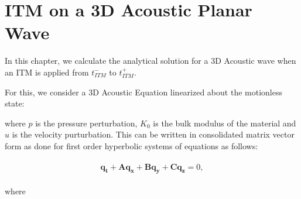 
\section{\ac{ITM} on a 3D Acoustic Planar Wave}\label{section:3DITMAcoustic}
In this chapter, we calculate the analytical solution for a 3D Acoustic wave when an \ac{ITM} is applied from $t_{ITM}^-$ to $t_{ITM}^+$.

For this, we consider a 3D Acoustic Equation linearized about the motionless state:

where $p$ is the pressure perturbation, $K_0$ is the bulk modulus of the material and $u$ is the velocity purturbation. 
This can be written in consolidated matrix vector form as done for first order hyperbolic systems of equations as follows:

\begin{align}
    \begin{split}
        \mathbf{q_t} + \mathbf{Aq_x} + \mathbf{Bq_y} + \mathbf{Cq_z} = 0,
    \end{split}
    \label{eq:3Dacoustic}
\end{align}

where 

